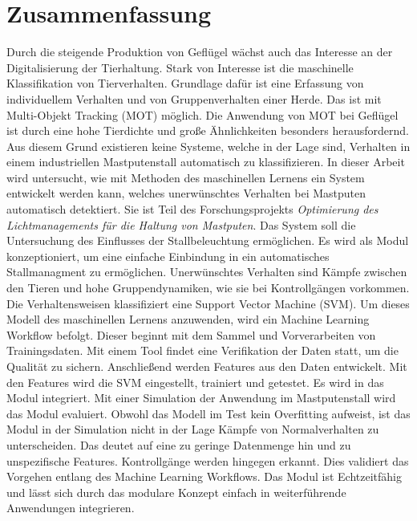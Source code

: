 \section*{Zusammenfassung}
\vspace*{-5mm}
Durch die steigende Produktion von Geflügel wächst auch das Interesse an der Digitalisierung der Tierhaltung. Stark von Interesse ist die maschinelle Klassifikation von Tierverhalten. Grundlage dafür ist eine Erfassung von individuellem Verhalten und von Gruppenverhalten einer Herde. Das ist mit Multi-Objekt Tracking (MOT) möglich. Die Anwendung von MOT bei Geflügel ist durch eine hohe Tierdichte und große Ähnlichkeiten besonders herausfordernd. Aus diesem Grund existieren keine Systeme, welche in der Lage sind, Verhalten in einem industriellen Mastputenstall automatisch zu klassifizieren. In dieser Arbeit wird untersucht, wie mit Methoden des maschinellen Lernens ein System entwickelt werden kann, welches unerwünschtes Verhalten bei Mastputen automatisch detektiert. Sie ist Teil des Forschungsprojekts \textit{Optimierung des Lichtmanagements für die Haltung von Mastputen}. Das System soll die Untersuchung des Einflusses der Stallbeleuchtung ermöglichen. Es wird als Modul konzeptioniert, um eine einfache Einbindung in ein automatisches Stallmanagment zu ermöglichen. Unerwünschtes Verhalten sind Kämpfe zwischen den Tieren und hohe Gruppendynamiken, wie sie bei Kontrollgängen vorkommen. Die Verhaltensweisen klassifiziert eine Support Vector Machine (SVM). Um dieses Modell des maschinellen Lernens anzuwenden, wird ein Machine Learning Workflow befolgt. Dieser beginnt mit dem Sammel und Vorverarbeiten von Trainingsdaten. Mit einem Tool findet eine Verifikation der Daten statt, um die Qualität zu sichern. Anschließend werden Features aus den Daten entwickelt. Mit den Features wird die SVM eingestellt, trainiert und getestet. Es wird in das Modul integriert. Mit einer Simulation der Anwendung im Mastputenstall wird das Modul evaluiert. Obwohl das Modell im Test kein Overfitting aufweist, ist das Modul in der Simulation nicht in der Lage Kämpfe von Normalverhalten zu unterscheiden. Das deutet auf eine zu geringe Datenmenge hin und zu unspezifische Features. Kontrollgänge werden hingegen erkannt. Dies validiert das Vorgehen entlang des Machine Learning Workflows. Das Modul ist Echtzeitfähig und lässt sich durch das modulare Konzept einfach in weiterführende Anwendungen integrieren. 
